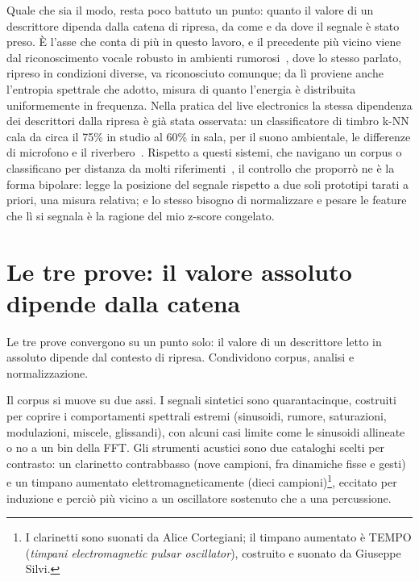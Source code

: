 \documentclass{article}
\begin{document}
Quale che sia il modo, resta poco battuto un punto: quanto il valore di un descrittore dipenda dalla catena di ripresa, da come e da dove il segnale è stato preso. È l'asse che conta di più in questo lavoro, e il precedente più vicino viene dal riconoscimento vocale robusto in ambienti rumorosi~\cite{shen1998robust,misra2004spectral}, dove lo stesso parlato, ripreso in condizioni diverse, va riconosciuto comunque; da lì proviene anche l'entropia spettrale che adotto, misura di quanto l'energia è distribuita uniformemente in frequenza. Nella pratica del live electronics la stessa dipendenza dei descrittori dalla ripresa è già stata osservata: un classificatore di timbro k-NN cala da circa il 75\% in studio al 60\% in sala, per il suono ambientale, le differenze di microfono e il riverbero~\cite{bullock2008implementing}. Rispetto a questi sistemi, che navigano un corpus o classificano per distanza da molti riferimenti~\cite{schwarz2006catart,bullock2008implementing}, il controllo che proporrò ne è la forma bipolare: legge la posizione del segnale rispetto a due soli prototipi tarati a priori, una misura relativa; e lo stesso bisogno di normalizzare e pesare le feature che lì si segnala è la ragione del mio z-score congelato. %

\section{Le tre prove: il valore assoluto dipende dalla catena}\label{sec:basale}

Le tre prove convergono su un punto solo: il valore di un descrittore letto in assoluto dipende dal contesto di ripresa. Condividono corpus, analisi e normalizzazione. %


Il corpus si muove su due assi. I segnali sintetici sono quarantacinque, costruiti per coprire i comportamenti spettrali estremi (sinusoidi, rumore, saturazioni, modulazioni, miscele, glissandi), con alcuni casi limite come le sinusoidi allineate o no a un bin della FFT. Gli strumenti acustici sono due cataloghi scelti per contrasto: un clarinetto contrabbasso (nove campioni, fra dinamiche fisse e gesti) e un timpano aumentato elettromagneticamente (dieci campioni)\footnote{I clarinetti sono suonati da Alice Cortegiani; il timpano aumentato è TEMPO (\emph{timpani electromagnetic pulsar oscillator}), costruito e suonato da Giuseppe Silvi.}, eccitato per induzione e perciò più vicino a un oscillatore sostenuto che a una percussione.
\end{document}
